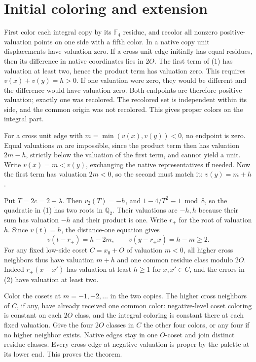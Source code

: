 \documentclass[10pt,letterpaper]{article}
\begin{document}
\section*{Initial coloring and extension}
First color each integral copy by its \(\mathbb F_4\) residue,
and recolor all nonzero positive-valuation points on one side
with a fifth color. In a native copy unit displacements have
valuation zero. If a cross unit edge initially has equal residues,
then its difference in native coordinates lies in \(2O\).
The first term of (1) has valuation at least two, hence the
product term has valuation zero. This requires \(v(x)+v(y)=h>0\).
If one valuation were zero, they would be different and the
difference would have valuation zero. Both endpoints are
therefore positive-valuation; exactly one was recolored.
The recolored set is independent within its side, and the common
origin was not recolored. This gives proper colors on the integral part.

For a cross unit edge with \(m=\min(v(x),v(y))<0\), no endpoint
is zero. Equal valuations \(m\) are impossible, since the
product term then has valuation \(2m-h\), strictly below
the valuation of the first term, and cannot yield a unit.
Write \(v(x)=m<v(y)\), exchanging the native representatives
if needed. Now the first term has valuation \(2m<0\), so the
second must match it: \(v(y)=m+h\).

Put \(T=2c=2-\lambda\). Then \(v_2(T)=-h\), and
\(1-4/T^2\equiv1\bmod 8\), so the quadratic in (1) has
two roots in \(\mathbb Q_2\). Their valuations are \(-h,h\)
because their sum has valuation \(-h\) and their product is one.
Write \(r_+\) for the root of valuation \(h\). Since
\(v(t)=h\), the distance-one equation gives
\[
 v(t-r_+)=h-2m,\qquad v(y-r_+x)=h-m\ge2. \tag{2}
\]
For any fixed low-side coset \(C=x_0+O\) of valuation \(m<0\),
all higher cross neighbors thus have valuation \(m+h\) and
one common residue class modulo \(2O\). Indeed \(r_+(x-x')\)
has valuation at least \(h\ge1\) for \(x,x'\in C\), and the
errors in (2) have valuation at least two.

Color the cosets at \(m=-1,-2,\ldots\) in the two copies.
The higher cross neighbors of \(C\), if any, have already
received one common color: negative-level coset coloring is
constant on each \(2O\) class, and the integral coloring is
constant there at each fixed valuation. Give the four \(2O\)
classes in \(C\) the other four colors, or any four if no
higher neighbor exists. Native edges stay in one \(O\)-coset
and join distinct residue classes. Every cross edge at negative
valuation is proper by the palette at its lower end. This
proves the theorem.
\end{document}
